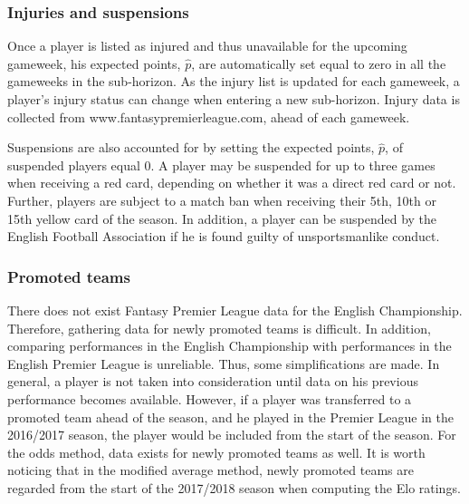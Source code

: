 \subsubsection{Injuries and suspensions}
Once a player is listed as injured and thus unavailable for the upcoming gameweek, his expected points, $\hat{p}$, are automatically set equal to zero in all the gameweeks in the sub-horizon. As the injury list is updated for each gameweek, a player's injury status can change when entering a new sub-horizon. Injury data is collected from www.fantasypremierleague.com, ahead of each gameweek. 

\newpar

Suspensions are also accounted for by setting the expected points, $\hat{p}$, of suspended players equal 0. A player may be suspended for up to three games when receiving a red card, depending on whether it was a direct red card or not. Further, players are subject to a match ban when receiving their 5th, 10th or 15th yellow card of the season. In addition, a player can be suspended by the English Football Association if he is found guilty of unsportsmanlike conduct. 


\subsubsection{Promoted teams}
There does not exist Fantasy Premier League data for the English Championship. Therefore, gathering data for newly promoted teams is difficult. In addition, comparing performances in the English Championship with performances in the English Premier League is unreliable. Thus, some simplifications are made. In general, a player is not taken into consideration until data on his previous performance becomes available. However, if a player was transferred to a promoted team ahead of the season, and he played in the Premier League in the 2016/2017 season, the player would be included from the start of the season. For the odds method, data exists for newly promoted teams as well. It is worth noticing that in the modified average method, newly promoted teams are regarded from the start of the 2017/2018 season when computing the Elo ratings. 

